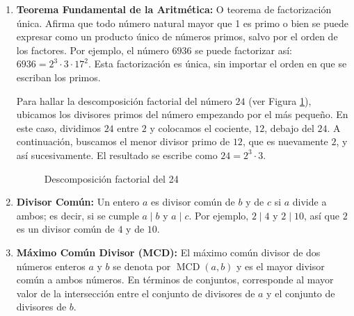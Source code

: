 \begin{enumerate}
\begin{table}[ht]
{\begin{tabular}{|c|c|c|c|c|c|l|l|l|l|}
\end{tabular}%
}
\end{table}
 \item \textbf{Teorema Fundamental de la Aritmética:} O teorema de factorización única. Afirma que todo número natural mayor que 1 es primo o bien se puede expresar como un producto único de números primos, salvo por el orden de los factores. Por ejemplo, el número $6936$ se puede factorizar así: $6936=2^3\cdot 3\cdot 17^2$. Esta factorización es única, sin importar el orden en que se escriban los primos.

Para hallar la descomposición factorial del número $24$ (ver Figura \ref{fig:primos}), ubicamos los divisores primos del número empezando por el más pequeño. En este caso, dividimos $24$ entre $2$ y colocamos el cociente, $12$, debajo del $24$. A continuación, buscamos el menor divisor primo de $12$, que es nuevamente $2$, y así sucesivamente. El resultado se escribe como $24=2^3\cdot 3$.

\begin{figure}[ht]
    \centering
    \caption{Descomposición factorial del 24}
    \label{fig:primos}
\end{figure}

    \item \textbf{Divisor Común:} Un entero $a$ es divisor común de $b$ y de $c$ si $a$ divide a ambos; es decir, si se cumple $a \mid b$ y $a \mid c$. Por ejemplo, $2 \mid 4$ y $2 \mid 10$, así que $2$ es un divisor común de $4$ y de $10$.

    \item \textbf{Máximo Común Divisor (MCD):} El máximo común divisor de dos números enteros $a$ y $b$ se denota por $\operatorname{MCD}(a,b)$ y es el mayor divisor común a ambos números. En términos de conjuntos, corresponde al mayor valor de la intersección entre el conjunto de divisores de $a$ y el conjunto de divisores de $b$.


\end{enumerate}
